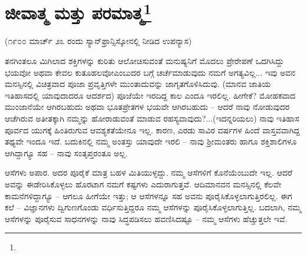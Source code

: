 
\chapter[ಜೀವಾತ್ಮ ಮತ್ತು ಪರಮಾತ್ಮ]{ಜೀವಾತ್ಮ ಮತ್ತು ಪರಮಾತ್ಮ\protect\footnote{}}

\begin{center}
(೧೯೦೦ ಮಾರ್ಚ್ ೨೩ ರಂದು ಸ್ಯಾನ್‌ಫ್ರಾನ್ಸಿಸ್ಕೋನಲ್ಲಿ ನೀಡಿದ ಉಪನ್ಯಾಸ)
\end{center}

ತನಗಿಂತಲೂ ಮಿಗಿಲಾದ ಶಕ್ತಿಗಳನ್ನು ಕುರಿತು ಆಲೋಚಿಸುವಂತೆ ಮನುಷ್ಯನಿಗೆ ಮೊದಲು ಪ್ರೇರೇಪಣೆ ಒದಗಿಸಿದ್ದು ಭಯವೋ ಅಥವಾ ಕೇವಲ ಕುತೂಹಲವೋ\break ಎಂಬುದರ ಬಗ್ಗೆ ಚರ್ಚೆಮಾಡುವುದು ನಮಗೆ ಅಗತ್ಯವಿಲ್ಲ... ಇವು ಅವನ ಮನಸ್ಸಿನಲ್ಲಿ ವಿಚಿತ್ರವಾದ ಪೂಜಾ ಪ್ರವೃತ್ತಿಗಳೇ ಮುಂತಾದುವನ್ನು ಜಾಗೃತಗೊಳಿಸಿದುವು. (ಮಾನವ ಜಾತಿಯ ಇತಿಹಾಸದಲ್ಲಿ ಯಾವುದಾದರೂ ಆದರ್ಶದ) ಪೂಜೆಯೇ ಇರದಿದ್ದ ಕಾಲ ಎಂದೂ ಇರಲಿಲ್ಲ. ಹೀಗೇಕೆ? ಮೋಹಕವಾದ ಮುಂಜಾನೆಯೇ ಆಗಿರಬಹುದು ಅಥವಾ ಭೂತಪ್ರೇತಗಳ ಭಯವೇ ಆಗಿರಬಹುದು – ಆದರೆ ನಾವು ನೋಡುವುದರ ಆಚೆಗಿರುವ ಅತೀತಕ್ಕಾಗಿ ನಮ್ಮನ್ನು ಹೋರಾಡುವಂತೆ ಮಾಡುವ ರಹಸ್ಯವಾವುದು?...\break (ಇದನ್ನರಿಯಲು) ನಾವು ಇತಿಹಾಸ ಪೂರ್ವದ ಯುಗಕ್ಕೆ ಹಿಂತಿರುಗುವ ಆವಶ್ಯಕತೆಯೇನೂ ಇಲ್ಲ. ಕಾರಣ, ಎರಡು ಸಾವಿರ ವರ್ಷಗಳ ಹಿಂದೆ ವಾಸ್ತವವಾಗಿದ್ದ ತಥ್ಯವೇ ಇಂದೂ ಇದೆ. ಬದುಕಿನಲ್ಲಿ ನಮ್ಮ ಅಂತಸ್ತು ಯಾವುದೇ ಇರಲಿ – ನಾವು ಶ‍್ರೀಮಂತರು ಹಾಗೂ ಶಕ್ತಿಶಾಲಿಗಳೂ ಆಗಿದ್ದಾಗ್ಯೂ ಸಹ – ನಾವು ಸಂತೃಪ್ತರಂತೂ ಅಲ್ಲ.

\vskip 4pt

ಆಸೆಗಳು ಅಪಾರ. ಅದರ ಪೂರೈಕೆ ಮಾತ್ರ ಬಹಳ ಮಿತಿಯುಳ್ಳದ್ದು. ನಮ್ಮ ಆಸೆಗಳಿಗೆ ಕೊನೆಯೆಂಬುದೇ ಇಲ್ಲ. ಆದರೆ ಅವನ್ನು ಈಡೇರಿಸಿಕೊಳ್ಳಲು ಹೊರಟಾಗ ನಮಗೆ ಕಷ್ಟಗಳು ಎದುರಾಗುತ್ತವೆ. ಆದಿಮಾನವನ ಮನಸ್ಸಿನಲ್ಲಿ ಕೆಲವೇ ಕಾಮನೆಗಳಿದ್ದಾಗ್ಯೂ – ಆಗಲೂ ಹೀಗೆಯೇ ಇತ್ತು; ಆ ಆಸೆಗಳನ್ನೂ ಸಹ ಅವನು ಪೂರೈಸಿಕೊಳ್ಳಲಾಗುತ್ತಿರಲಿಲ್ಲ. ಈಗ ಕಲೆ – ವಿಜ್ಞಾನಗಳು ದ್ವಿಗುಣಗೊಂಡು ವರ್ಧಿಸುತ್ತಿದ್ದರೂ ನಮ್ಮ ಆಸೆಗಳನ್ನು ಪೂರೈಸಿಕೊಳ್ಳಲಾಗುತ್ತಿಲ್ಲ. ಬದಲಾಗಿ, ನಮ್ಮ ಆಸೆಗಳನ್ನು ಪೂರೈಸುವ ಸಾಧನಗಳನ್ನು ನಾವು ಸಿದ್ಧಪಡಿಸಲು ಹವಣಿಸಿದಷ್ಟೂ – ನಮ್ಮ ಆಸೆಗಳು ಹೆಚ್ಚುತ್ತಲೇ ಇವೆ.

\vskip 4pt


